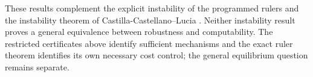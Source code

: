 These results complement the explicit instability of the programmed
rulers and the instability theorem of Castilla-Castellano--Lucia
\cite{gapInstability}. Neither instability result proves a general
equivalence between robustness and computability. The restricted
certificates above identify sufficient mechanisms and the exact
ruler theorem identifies its own necessary cost control; the general
equilibrium question remains separate.



